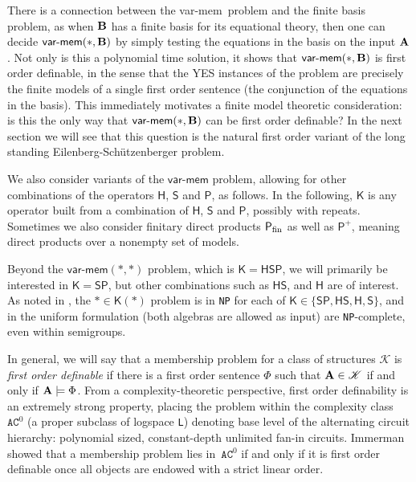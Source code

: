 \documentclass[reqno]{amsart}
\theoremstyle{plain}
\theoremstyle{definition}
\newcommand{\varmem}{\textsf{var-mem}}
\begin{document}
There is a connection between the \varmem\ problem and the finite basis problem, as when ${\bf B}$ has a finite basis for its equational theory, then one can decide $\varmem(*,{\bf B})$ by simply testing the equations in the basis on the input ${\bf A}$.  Not only is this a polynomial time solution, it shows that $\varmem(*,{\bf B})$ is first order definable, in the sense that the YES instances of the problem are precisely the finite models of a single first order sentence (the conjunction of the equations in the basis). 
This immediately motivates a finite model theoretic consideration: is this the only way that $\varmem(*,{\bf B})$ can be first order definable?  In the next section we will see that this question is the natural first order variant of the long standing Eilenberg-Sch\"utzenberger problem.

We also consider variants of the $\varmem$ problem, allowing for other combinations of the operators $\mathsf{H}$, $\mathsf{S}$ and $\mathsf{P}$, as follows.  In the following, $\mathsf{K}$ is any operator built from a combination of $\mathsf{H}$, $\mathsf{S}$ and $\mathsf{P}$, possibly with repeats.  Sometimes we also consider finitary direct products $\mathsf{P}_{\rm fin}$ as well as $\mathsf{P}^+$, meaning direct products over a nonempty set of models.\medskip


\medskip

Beyond the $\varmem(*,*)$ problem, which is $\mathsf{K}=\mathsf{HSP}$, we will primarily be interested in $\mathsf{K}=\mathsf{SP}$, but other combinations such as $\mathsf{HS}$, and $\mathsf{H}$ are of interest.  As noted in \cite[Table~1]{jacmck}, the $*\in \mathsf{K}(*)$ problem is in \texttt{NP} for each of $\mathsf{K}\in\{\mathsf{SP},\mathsf{HS},\mathsf{H},\mathsf{S}\}$, and in the uniform formulation (both algebras are allowed as input) are \texttt{NP}-complete, even within semigroups.

In general, we will say that a membership problem for a class of structures $\mathscr{K}$ is \emph{first order definable} if there is a first order sentence $\Phi$ such that ${\bf A}\in \mathscr{K}$ if and only if ${\bf A}\models\Phi$.
From a complexity-theoretic perspective, first order definability is an extremely strong property, placing the problem within the complexity class~$\texttt{AC}^0$ (a proper subclass of logspace \texttt{L}) denoting base level of the alternating circuit hierarchy: polynomial sized, constant-depth unlimited fan-in circuits.  
Immerman~\cite{imm} showed that a membership problem lies in~$\texttt{AC}^0$ if and only if it is first order definable once all objects are endowed with a strict linear order.
\end{document}
